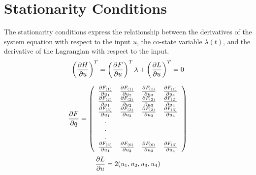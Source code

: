 \section{Stationarity Conditions}

The stationarity conditions express the relationship between the derivatives of the system equation with respect to the input $u$, the co-state variable $\lambda(t)$, and the derivative of the Lagrangian with respect to the input.
\begin{equation}
    \left(\frac{\partial H}{\partial u}\right)^T = \left(\frac{\partial F}{\partial u}\right)^T \lambda + \left(\frac{\partial L}{\partial u}\right)^T = 0
\end{equation}

\begin{equation}
    \frac{\partial F}{\partial q} = \left(
    \begin{array}{c c c c c c}
    \frac{\partial F_{(1)}}{\partial u_1} & \frac{\partial F_{(1)}}{\partial u_2} & \frac{\partial F_{(1)}}{\partial u_3} & \frac{\partial F_{(1)}}{\partial u_4} \\
    \frac{\partial F_{(2)}}{\partial u_1} & \frac{\partial F_{(2)}}{\partial u_2} & \frac{\partial F_{(2)}}{\partial u_3} & \frac{\partial F_{(2)}}{\partial u_4} \\
    \frac{\partial F_{(3)}}{\partial u_1} & \frac{\partial F_{(3)}}{\partial u_2} & \frac{\partial F_{(3)}}{\partial u_3} & \frac{\partial F_{(3)}}{\partial u_4} \\
    .\\
    .\\
    .\\
    \frac{\partial F_{(6)}}{\partial u_1} & \frac{\partial F_{(6)}}{\partial u_2} & \frac{\partial F_{(6)}}{\partial u_3} & \frac{\partial F_{(6)}}{\partial u_4} \\
    \end{array}\right)
\end{equation}
\begin{equation}
    \frac{\partial L}{\partial u} = 2 (u_1 , u_2 , u_3 , u_4)
\end{equation}

